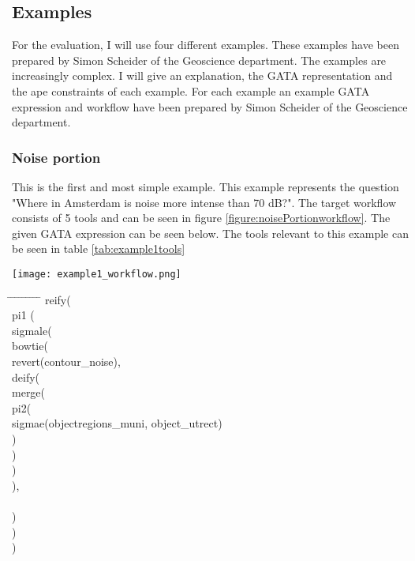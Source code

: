 \documentclass{article}
\begin{document}
\subsection{Examples}

For the evaluation, I will use four different examples. These examples have been prepared by Simon Scheider of the Geoscience department. The examples are increasingly complex. I will give an explanation, the GATA representation and the ape constraints of each example. For each example an example GATA expression and workflow have been prepared by Simon Scheider of the Geoscience department.

\subsubsection{Noise portion}
This is the first and most simple example. This example represents the question "Where in Amsterdam is noise more intense than 70 dB?". The target workflow consists of 5 tools and can be seen in figure \ref{figure:noisePortionworkflow}. The given GATA expression can be seen below. The tools relevant to this example can be seen in table \ref{tab:example1tools}


\begin{sidewaysfigure}
  \centering
    \texttt{[image: example1\_workflow.png]}
    \caption{The given workflow for the noise portion example }
    \label{figure:noisePortionworkflow}
\end{sidewaysfigure}

\begin{tabbing}    
\hspace{0.5cm}     \= \hspace{0.5cm}  \= \hspace{0.5cm}  \= \hspace{0.5cm}  \=\hspace{0.5cm}  \=\hspace{0.5cm} \= \hspace{0.5cm}  \= \hspace{0.5cm} \= \hspace{0.5cm} \= \hspace{0.5cm}\kill
reify( \\
\> pi1 ( \\
\>\>sigmale(\\
\>\>\>bowtie(\\
\>\>\>\>revert(contour\_noise),\\ 
\>\>\>\>deify(\\
\>\>\>\>\>merge(\\
\>\>\>\>\>\>pi2(\\
\>\>\>\>\>\>\>sigmae(objectregions\_muni, object\_utrect)\\
\>\>\>\>\>\>)\\
\>\>\>\>\>)\\
\>\>\>\>)\\
\>\>\>),\\
\>\>\\
\>\>)\\
\>)\\
)
\end{tabbing}
\end{document}
